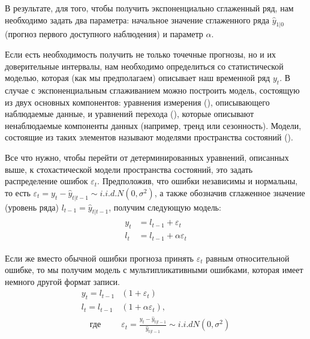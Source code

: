 В результате, для того, чтобы получить экспоненциально сглаженный ряд, нам необходимо задать два параметра: начальное значение сглаженного ряда $\hat{y}_{1|0}$ (прогноз первого доступного наблюдения) и параметр $\alpha$.

% 
Если есть необходимость получить не только точечные прогнозы, но и их доверительные интервалы, нам необходимо определиться со статистической моделью, которая (как мы предполагаем) описывает наш временной ряд ${y_t}$. В случае с экспоненциальным сглаживанием можно построить модель, состоящую из двух основных компонентов: уравнения измерения (), описывающего наблюдаемые данные, и уравнений перехода (), которые описывают ненаблюдаемые компоненты данных (например, тренд или сезонность). Модели, состоящие из таких элементов называют моделями пространства состояний ().

Все что нужно, чтобы перейти от детерминированных уравнений, описанных выше, к стохастической модели пространства состояний, это задать распределение ошибок $\varepsilon_t$. Предположив, что ошибки независимы и нормальны, то есть $\varepsilon_t = y_{t} - \hat{y}_{t|t-1} \sim i.i.d. N(0, \sigma^2)$, а также обозначив сглаженное значение (уровень ряда) $l_{t-1} = \hat{y}_{t|t-1}$, получим следующую модель:
\begin{align}
\begin{split} \label{ssm_simple_ets}
y_t &= l_{t-1} + \varepsilon_t\\
l_t &= l_{t-1} + \alpha \varepsilon_t
\end{split}
\end{align}

Если же вместо обычной ошибки прогноза принять $\varepsilon_t$ равным относительной ошибке, то мы получим модель с мультипликативными ошибками, которая имеет немного другой формат записи.
\begin{align*}
y_t = l_{t-1} &(1 + \varepsilon_t)\\
l_t = l_{t-1}&(1 + \alpha \varepsilon_t),\\
\quad  \text{где} \quad &\varepsilon_t = \frac{y_t - \hat{y}_{t|t-1}}{\hat{y}_{t|t-1}} \sim i.i.d N(0,\sigma^2)
\end{align*}


